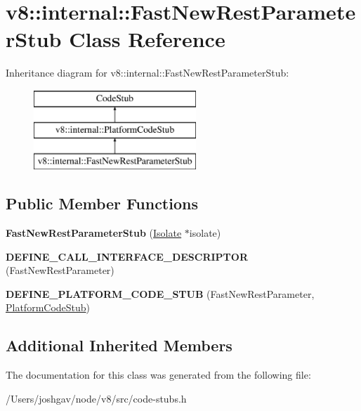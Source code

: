 \hypertarget{classv8_1_1internal_1_1_fast_new_rest_parameter_stub}{}\section{v8\+:\+:internal\+:\+:Fast\+New\+Rest\+Parameter\+Stub Class Reference}
\label{classv8_1_1internal_1_1_fast_new_rest_parameter_stub}
Inheritance diagram for v8\+:\+:internal\+:\+:Fast\+New\+Rest\+Parameter\+Stub\+:\begin{figure}[H]
\begin{center}
\leavevmode
\includegraphics[height=3.000000cm]{classv8_1_1internal_1_1_fast_new_rest_parameter_stub}
\end{center}
\end{figure}
\subsection*{Public Member Functions}
\begin{DoxyCompactItemize}
\item 
{\bfseries Fast\+New\+Rest\+Parameter\+Stub} (\hyperlink{classv8_1_1internal_1_1_isolate}{Isolate} $\ast$isolate)\hypertarget{classv8_1_1internal_1_1_fast_new_rest_parameter_stub_a03b74f232943230e90a964e1151df2e6}{}\label{classv8_1_1internal_1_1_fast_new_rest_parameter_stub_a03b74f232943230e90a964e1151df2e6}

\item 
{\bfseries D\+E\+F\+I\+N\+E\+\_\+\+C\+A\+L\+L\+\_\+\+I\+N\+T\+E\+R\+F\+A\+C\+E\+\_\+\+D\+E\+S\+C\+R\+I\+P\+T\+OR} (Fast\+New\+Rest\+Parameter)\hypertarget{classv8_1_1internal_1_1_fast_new_rest_parameter_stub_a5b4fab4bf43ef9eff28ee04a440d342f}{}\label{classv8_1_1internal_1_1_fast_new_rest_parameter_stub_a5b4fab4bf43ef9eff28ee04a440d342f}

\item 
{\bfseries D\+E\+F\+I\+N\+E\+\_\+\+P\+L\+A\+T\+F\+O\+R\+M\+\_\+\+C\+O\+D\+E\+\_\+\+S\+T\+UB} (Fast\+New\+Rest\+Parameter, \hyperlink{classv8_1_1internal_1_1_platform_code_stub}{Platform\+Code\+Stub})\hypertarget{classv8_1_1internal_1_1_fast_new_rest_parameter_stub_a6a4ff58fb89e04581189700e69d3fa99}{}\label{classv8_1_1internal_1_1_fast_new_rest_parameter_stub_a6a4ff58fb89e04581189700e69d3fa99}

\end{DoxyCompactItemize}
\subsection*{Additional Inherited Members}


The documentation for this class was generated from the following file\+:\begin{DoxyCompactItemize}
\item 
/\+Users/joshgav/node/v8/src/code-\/stubs.\+h\end{DoxyCompactItemize}
